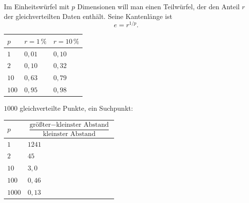 \begin{merksatz}
Im Einheitswürfel mit $p$ Dimensionen will man einen Teilwürfel, der den Anteil $r$ der gleichverteilten Daten enthält. Seine Kantenlänge ist
\[ e = r^{1/p} . \]

\begin{center}
{\small
\renewcommand{\arraystretch}{1.46}
\begin{tabular}{@{}P{1.6cm}P{2.6cm}P{2.6cm}@{}}
\toprule
$p$ & $r = 1\,\%$ & $r = 10\,\%$\\
\midrule
$1$ & $0{,}01$ & $0{,}10$\\
$2$ & $0{,}10$ & $0{,}32$\\
$10$ & $0{,}63$ & $0{,}79$\\
$100$ & $0{,}95$ & $0{,}98$\\
\bottomrule
\end{tabular}}
\end{center}

\begin{center}
\begin{minipage}{0.88\textwidth}
\end{minipage}
\end{center}

$1000$ gleichverteilte Punkte, ein Suchpunkt:
\begin{center}
{\small
\renewcommand{\arraystretch}{1.46}
\begin{tabular}{@{}P{1.6cm}P{4.4cm}@{}}
\toprule
$p$ & $\dfrac{\text{größter} - \text{kleinster Abstand}}{\text{kleinster Abstand}}$\\
\midrule
$1$ & $1241$\\
$2$ & $45$\\
$10$ & $3{,}0$\\
$100$ & $0{,}46$\\
$1000$ & $0{,}13$\\
\bottomrule
\end{tabular}}
\end{center}

\begin{center}
\begin{minipage}{0.88\textwidth}
\end{minipage}
\end{center}


\end{merksatz}
